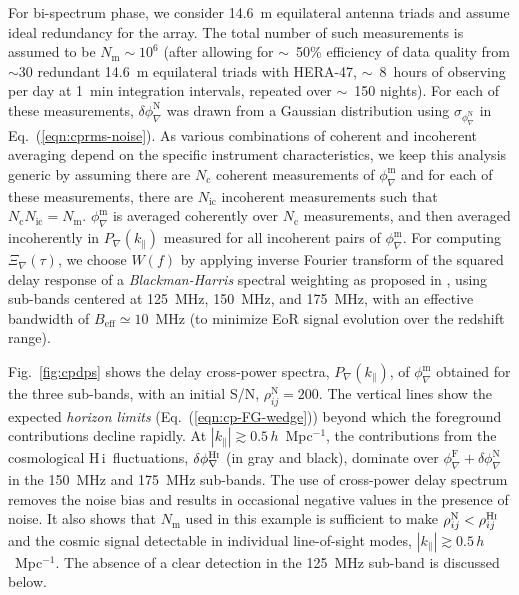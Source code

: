 \documentclass[
reprint,
superscriptaddress,
amsmath,
amssymb,
aps,
prd
]{revtex4-1}
\newcommand{\HI}{H\,{\sc i}}
\begin{document}
For bi-spectrum phase, we consider 14.6~m equilateral antenna triads and assume ideal redundancy for the array. The total number of such measurements is assumed to be $N_\textrm{m} \sim 10^6$ (after allowing for $\sim$~50\% efficiency of data quality from $\sim 30$ redundant 14.6~m equilateral triads with HERA-47, $\sim$~8~hours of observing per day at 1~min integration intervals, repeated over $\sim$~150 nights). For each of these measurements, $\delta\phi_\nabla^\textrm{N}$ was drawn from a Gaussian distribution using $\sigma_{\phi_\nabla^\textrm{N}}$ in Eq.~(\ref{eqn:cprms-noise}). As various combinations of coherent and incoherent averaging depend on the specific instrument characteristics, we keep this analysis generic by assuming there are $N_\textrm{c}$ coherent measurements of $\phi_\nabla^\textrm{m}$ and for each of these measurements, there are $N_\textrm{ic}$ incoherent measurements such that $N_\textrm{c}N_\textrm{ic}=N_\textrm{m}$. $\phi_\nabla^\textrm{m}$ is averaged coherently over $N_\textrm{c}$ measurements, and then averaged incoherently in $P_\nabla(k_\parallel)$ measured for all incoherent pairs of $\phi_\nabla^\textrm{m}$. For computing $\Xi_\nabla(\tau)$, we choose $W(f)$ by applying inverse Fourier transform of the squared delay response of a {\it Blackman-Harris} spectral weighting \cite{har78} as proposed in \cite{thy16}, using sub-bands centered at 125~MHz, 150~MHz, and 175~MHz, with an effective bandwidth of $B_\textrm{eff}\simeq 10$~MHz (to minimize EoR signal evolution over the redshift range).

Fig.~\ref{fig:cpdps} shows the delay cross-power spectra, $P_\nabla(k_\parallel)$, of $\phi_\nabla^\textrm{m}$ obtained for the three sub-bands, with an initial S/N, $\rho_{ij}^\textrm{N}=200$. The vertical lines show the expected {\it horizon limits} (Eq.~(\ref{eqn:cp-FG-wedge})) beyond which the foreground contributions decline rapidly. At $|k_\parallel| \gtrsim 0.5\,h$~Mpc$^{-1}$, the contributions from the cosmological \HI\ fluctuations, $\delta\phi_\nabla^\textrm{H{\sc i}}$ (in gray and black), dominate over $\phi_\nabla^\textrm{F} + \delta\phi_\nabla^\textrm{N}$ in the 150~MHz and 175~MHz sub-bands. The use of cross-power delay spectrum removes the noise bias and results in occasional negative values in the presence of noise. It also shows that $N_\textrm{m}$ used in this example is sufficient to make $\rho_{ij}^\textrm{N} < \rho_{ij}^\textrm{H{\sc i}}$ and the cosmic signal detectable in individual line-of-sight modes, $|k_\parallel| \gtrsim 0.5\,h$~Mpc$^{-1}$. The absence of a clear detection in the 125~MHz sub-band is discussed below.
\end{document}
